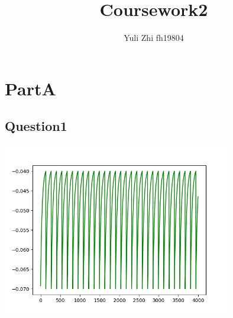 \documentclass[fleqn,11pt]{article}
\begin{document}
\title{Coursework2}
\author{Yuli Zhi fh19804}
\date{}
\maketitle
\section*{PartA}
\subsection*{Question1}

\begin{center} 
    \includegraphics[width=10cm]{graphs/Question1.png}
\end{center}
\end{document}
